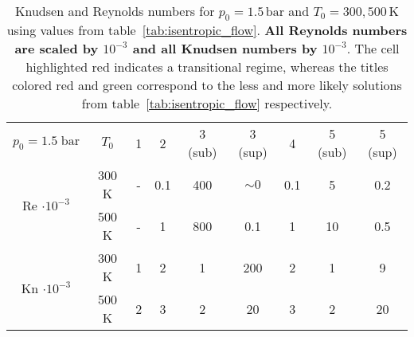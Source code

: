 \begin{table}[H]
    \centering
    \renewcommand{\arraystretch}{1.2}
    \begin{tabular}{|c|c|c|c|c|c|c|c|c|}
    \hline
    \multirow{2}{*}{\small $p_0 = 1.5\;\text{bar}$} 
        & \multirow{2}{*}{$T_0$} 
        & \multirow{2}{*}{1} 
        & \multirow{2}{*}{2} 
        & \multirow{2}{*}{\color{greenColor} 3 (sub)} 
        & \multirow{2}{*}{\color{redColor} 3 (sup)} 
        & \multirow{2}{*}{4} 
        & \multirow{2}{*}{\color{redColor} 5 (sub)} 
        & \multirow{2}{*}{\color{greenColor} 5 (sup)} \\
    & & & & & & & & \\ \hline

    \multirow{2}{*}{Re $\cdot10^{-3}$} 
      & 300 K 
          & - 
          & 0.1 
          & 400 
          & $\sim 0$ 
          & 0.1 
          & 5 
          & 0.2 \\ \cline{2-9}
      & 500 K 
          & - 
          & 1 
          & 800 
          & 0.1 
          & 1 
          & 10 
          & 0.5 \\ \hline

    \multirow{2}{*}{Kn $\cdot10^{-3}$} 
      & 300 K 
          & 1 
          & 2 
          & 1 
          & \cellcolor[HTML]{FFADA8}200 
          & 2 
          & 1 
          & 9 \\ \cline{2-9}
      & 500 K 
          & 2 
          & 3 
          & 2 
          & 20 
          & 3 
          & 2 
          & 20 \\ \hline
    \end{tabular}
    \caption{Knudsen and Reynolds numbers for $p_0 = 1.5\,\mathrm{bar}$ and $T_0 = 300, 500\,\mathrm{K}$ using values from table~\ref{tab:isentropic_flow}. \textbf{All Reynolds numbers are scaled by $10^{-3}$ and all Knudsen numbers by $10^{-3}$}. The cell highlighted red indicates a transitional regime, whereas the titles colored red and green correspond to the less and more likely solutions from table~\ref{tab:isentropic_flow} respectively.}
    \label{tab:test-knudsen-reynolds-isentropic}
\end{table}
